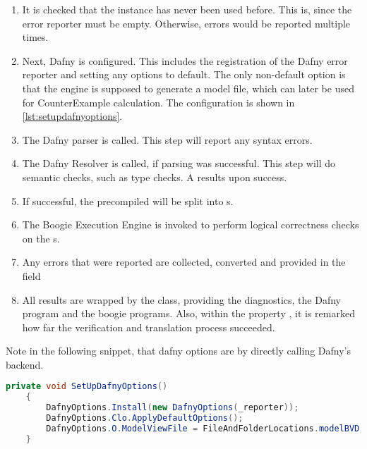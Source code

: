 \begin{enumerate}
    \item It is checked that the instance has never been used before.
    This is, since the error reporter must be empty.
    Otherwise, errors would be reported multiple times.
    \item Next, Dafny is configured.
    This includes the registration of the Dafny error reporter and setting any options to default.
    The only non-default option is that the engine is supposed to generate a model file, which can later be used for CounterExample calculation.
    The configuration is shown in \ref{lst:setupdafnyoptions}.
    \item The Dafny parser is called.
    This step will report any syntax errors.
    \item The Dafny Resolver is called, if parsing was successful.
    This step will do semantic checks, such as type checks.
    A  results upon success.
    \item If successful, the precompiled  will be split into s.
    \item The Boogie Execution Engine is invoked to perform logical correctness checks on the s.
    \item Any errors that were reported are collected, converted and provided in the field 
    \item All results are wrapped by the  class, providing the diagnostics, the Dafny program and the boogie programs.
    Also, within the property , it is remarked how far the verification and translation process succeeded.
\end{enumerate}


Note in the following snippet, that dafny options are by directly calling Dafny's backend.
\begin{lstlisting}[language=csharp, caption={Setting up Dafny Options}, captionpos=b, label={lst:setupdafnyoptions}]
    private void SetUpDafnyOptions()
    {
        DafnyOptions.Install(new DafnyOptions(_reporter));
        DafnyOptions.Clo.ApplyDefaultOptions();
        DafnyOptions.O.ModelViewFile = FileAndFolderLocations.modelBVD;
    }
\end{lstlisting}





